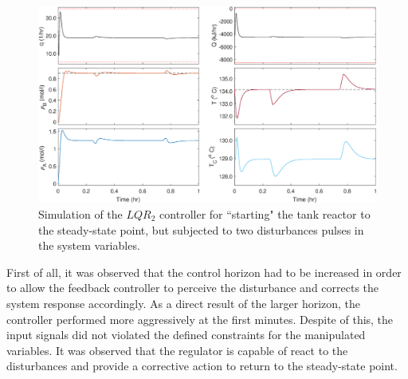 \documentclass[a4paper,11pt]{book}
\numberwithin{figure}{chapter}
\numberwithin{equation}{chapter}
\numberwithin{table}{chapter}
\theoremstyle{definition}
\begin{document}
\begin{figure}[ht] \centering
	\includegraphics[width=\textwidth]{chapter7/lqr02}
	
	\caption{Simulation of the $LQR_2$ controller for ``starting" the tank reactor to the steady-state point, but subjected to two disturbances pulses in the system variables. }
	\label{fig:lqr02}
\end{figure}	

First of all, it was observed that the control horizon had to be increased in order to allow the feedback controller to perceive the disturbance and corrects the system response accordingly. As a direct result of the larger horizon, the controller performed more aggressively at the first minutes. Despite of this, the input signals did not violated the defined constraints for the manipulated variables. It was observed that the regulator is capable of react to the disturbances and provide a corrective action to return to the steady-state point. 
\end{document}
